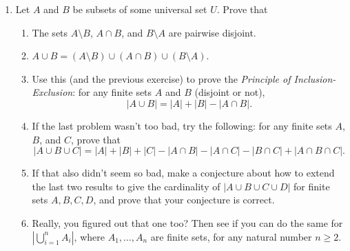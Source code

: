 \documentclass[letterpaper,12pt]{article}
\begin{document}
\begin{enumerate}
\item Let $A$ and $B$ be subsets of some universal set $U$. Prove that
\begin{enumerate}
 \item The sets $A\setminus B$, $A\cap B$, and $B\setminus A$ are pairwise disjoint.
 \item $A\cup B = (A\setminus B)\cup (A\cap B) \cup (B\setminus A)$.
 \item Use this (and the previous exercise) to prove the {\em Principle of Inclusion-Exclusion}: for any finite sets $A$ and $B$ (disjoint or not), 
\[
 |A\cup B| = |A|+|B|-|A\cap B|.
\]
 \item If the last problem wasn't too bad, try the following: for any finite sets $A$, $B$, and $C$, prove that
\[
 |A\cup B\cup C| = |A|+|B|+|C|-|A\cap B|-|A\cap C|-|B\cap C|+|A\cap B\cap C|.
\]
 \item If that also didn't seem so bad, make a conjecture about how to extend the last two results to give the cardinality of $|A\cup B\cup C\cup D|$ for finite sets $A,B,C,D$, and prove that your conjecture is correct.
 \item Really, you figured out that one too? Then see if you can do the same for $\displaystyle\left|\bigcup_{i=1}^nA_i\right|$, where $A_1,\ldots, A_n$ are finite sets, for any natural number $n\geq 2$.
\end{enumerate}




 \end{enumerate}
\end{document}
